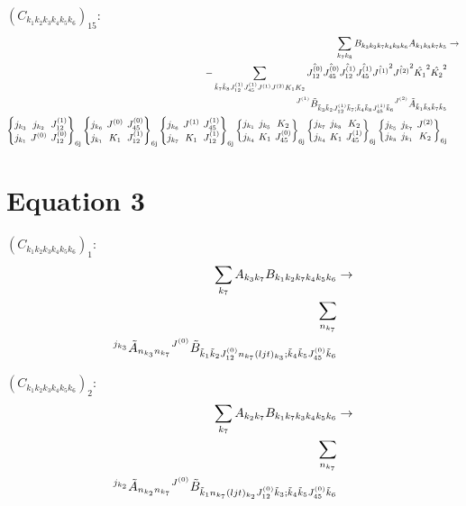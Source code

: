 \documentclass[11pt]{article}
\newcommand{\sixj}[6]{\begingroup\setlength{\arraycolsep}{0.2em}\begin{Bmatrix} #1 & #2 & #3 \\ #4 & #5 & #6 \end{Bmatrix}_{\text{6j}}\endgroup}
\begin{document}
$\left({C}_{{k}_{1}{k}_{2}{k}_{3}{k}_{4}{k}_{5}{k}_{6}}\right)_{15}$:
\begin{align}
\sum_{{k}_{7}{k}_{8}}{B}_{{k}_{3}{k}_{2}{k}_{7}{k}_{4}{k}_{8}{k}_{6}}{A}_{{k}_{1}{k}_{8}{k}_{7}{k}_{5}}&\rightarrow \notag \\-\sum_{\tilde{k}_{7}\tilde{k}_{8}J^{(1)}_{12}J^{(1)}_{45}J^{(1)}J^{(2)}K_{1}K_{2}}\hat{J^{(0)}_{12}}\hat{J^{(0)}_{45}}\hat{J^{(1)}_{12}}\hat{J^{(1)}_{45}}\hat{J^{(1)}}^{2}\hat{J^{(2)}}^{2}\hat{K_{1}}^{2}\hat{K_{2}}^{2}& \notag \\{}^{J^{(1)}}\tilde{B}_{\tilde{k}_{3}\tilde{k}_{2}J^{(1)}_{12}\tilde{k}_{7};\tilde{k}_{4}\tilde{k}_{8}J^{(1)}_{45}\tilde{k}_{6}}{}^{J^{(2)}}\tilde{A}_{\tilde{k}_{1}\tilde{k}_{8}\tilde{k}_{7}\tilde{k}_{5}}& \notag \\\sixj{j_{{k}_{3}}}{j_{{k}_{2}}}{J^{(1)}_{12}}{j_{{k}_{1}}}{J^{(0)}}{J^{(0)}_{12}}\sixj{j_{{k}_{6}}}{J^{(0)}}{J^{(0)}_{45}}{j_{{k}_{1}}}{K_{1}}{J^{(1)}_{12}}\sixj{j_{{k}_{6}}}{J^{(1)}}{J^{(1)}_{45}}{j_{{k}_{7}}}{K_{1}}{J^{(1)}_{12}}\sixj{j_{{k}_{1}}}{j_{{k}_{5}}}{K_{2}}{j_{{k}_{4}}}{K_{1}}{J^{(0)}_{45}}\sixj{j_{{k}_{7}}}{j_{{k}_{8}}}{K_{2}}{j_{{k}_{4}}}{K_{1}}{J^{(1)}_{45}}\sixj{j_{{k}_{5}}}{j_{{k}_{7}}}{J^{(2)}}{j_{{k}_{8}}}{j_{{k}_{1}}}{K_{2}}
\end{align}

\section{Equation 3}
$\left({C}_{{k}_{1}{k}_{2}{k}_{3}{k}_{4}{k}_{5}{k}_{6}}\right)_{1}$:
\begin{align}
\sum_{{k}_{7}}{A}_{{k}_{3}{k}_{7}}{B}_{{k}_{1}{k}_{2}{k}_{7}{k}_{4}{k}_{5}{k}_{6}}&\rightarrow \notag \\\sum_{n_{{k}_{7}}}& \notag \\{}^{j_{{k}_{3}}}\tilde{A}_{n_{{k}_{3}}n_{{k}_{7}}}{}^{J^{(0)}}\tilde{B}_{\tilde{k}_{1}\tilde{k}_{2}J^{(0)}_{12}n_{{k}_{7}}(ljt)_{{k}_{3}};\tilde{k}_{4}\tilde{k}_{5}J^{(0)}_{45}\tilde{k}_{6}}& \notag \\
\end{align}

$\left({C}_{{k}_{1}{k}_{2}{k}_{3}{k}_{4}{k}_{5}{k}_{6}}\right)_{2}$:
\begin{align}
\sum_{{k}_{7}}{A}_{{k}_{2}{k}_{7}}{B}_{{k}_{1}{k}_{7}{k}_{3}{k}_{4}{k}_{5}{k}_{6}}&\rightarrow \notag \\\sum_{n_{{k}_{7}}}& \notag \\{}^{j_{{k}_{2}}}\tilde{A}_{n_{{k}_{2}}n_{{k}_{7}}}{}^{J^{(0)}}\tilde{B}_{\tilde{k}_{1}n_{{k}_{7}}(ljt)_{{k}_{2}}J^{(0)}_{12}\tilde{k}_{3};\tilde{k}_{4}\tilde{k}_{5}J^{(0)}_{45}\tilde{k}_{6}}& \notag \\
\end{align}
\end{document}

